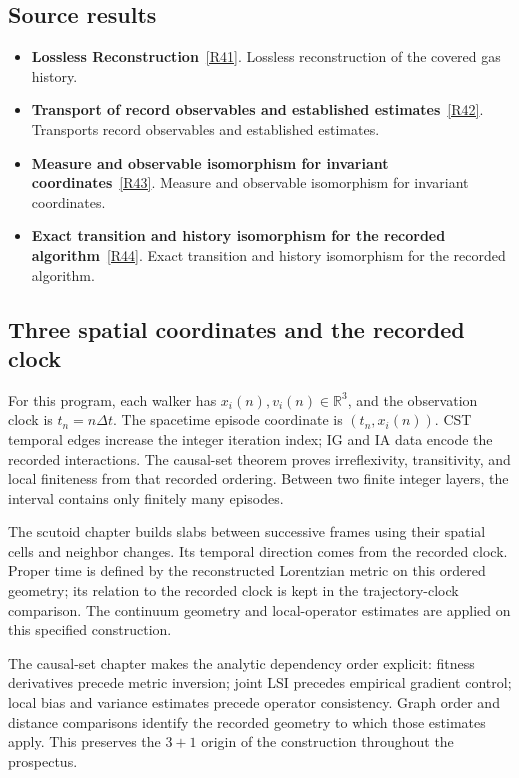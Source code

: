 \documentclass[11pt,a4paper]{article}
\begin{document}
\subsection*{Source results}
\begin{itemize}
\item \textbf{Lossless Reconstruction}~\hyperref[src:thm-fractal-set-lossless]{[R41]}. Lossless reconstruction of the covered gas history.
\item \textbf{Transport of record observables and established estimates}~\hyperref[src:prop-fractal-set-analytic-transfer]{[R42]}. Transports record observables and established estimates.
\item \textbf{Measure and observable isomorphism for invariant coordinates}~\hyperref[src:thm-sm-direct-measure-isomorphism]{[R43]}. Measure and observable isomorphism for invariant coordinates.
\item \textbf{Exact transition and history isomorphism for the recorded algorithm}~\hyperref[src:thm-sm-instantiated-record-transition]{[R44]}. Exact transition and history isomorphism for the recorded algorithm.
\end{itemize}
\subsection*{Three spatial coordinates and the recorded clock}
For this program, each walker has \(x_i(n),v_i(n)\in\mathbb R^3\), and the observation clock is \(t_n=n\Delta t\). The spacetime episode coordinate is \((t_n,x_i(n))\). CST temporal edges increase the integer iteration index; IG and IA data encode the recorded interactions. The causal-set theorem proves irreflexivity, transitivity, and local finiteness from that recorded ordering. Between two finite integer layers, the interval contains only finitely many episodes.

The scutoid chapter builds slabs between successive frames using their spatial cells and neighbor changes. Its temporal direction comes from the recorded clock. Proper time is defined by the reconstructed Lorentzian metric on this ordered geometry; its relation to the recorded clock is kept in the trajectory-clock comparison. The continuum geometry and local-operator estimates are applied on this specified construction.

The causal-set chapter makes the analytic dependency order explicit: fitness derivatives precede metric inversion; joint LSI precedes empirical gradient control; local bias and variance estimates precede operator consistency. Graph order and distance comparisons identify the recorded geometry to which those estimates apply. This preserves the \(3+1\) origin of the construction throughout the prospectus.
\end{document}
